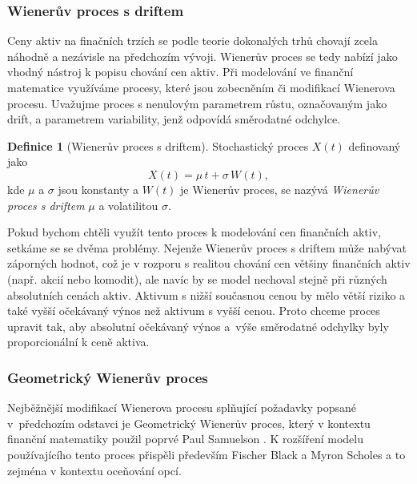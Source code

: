 \documentclass[a4paper,12pt]{report}
\theoremstyle{definition} \newtheorem{definice}[veta]{Definice}
\theoremstyle{remark}
\begin{document}
\subsubsection{Wienerův proces s driftem}
Ceny aktiv na finačních trzích se podle teorie dokonalých trhů chovají zcela náhodně a nezávisle na předchozím vývoji.
Wienerův proces se tedy nabízí jako vhodný nástroj k popisu chování cen aktiv.
Při modelování ve finanční matematice využíváme procesy, které jsou zobecněním či modifikací Wienerova procesu. 
Uvažujme proces s nenulovým parametrem růstu, označovaným jako drift, a parametrem variability, jenž odpovídá směrodatné odchylce.
\begin{definice}[Wienerův proces s driftem]\label{Wieneruv_proces_s_driftem}
Stochastický proces $X(t)$ definovaný jako
$$X(t)  = \mu\, t + \sigma\, W (t),$$
kde $\mu$ a $\sigma$ jsou konstanty a $W (t)$ je Wienerův proces,
se nazývá \textit{Wienerův proces  s driftem} $\mu$ a volatilitou $\sigma$.
\end{definice}
Pokud bychom chtěli využít tento proces k modelování cen finančních aktiv, setkáme se se dvěma problémy.
Nejenže Wienerův proces s driftem může nabývat záporných hodnot, což je v rozporu s realitou chování cen většiny finančních aktiv (např. akcií nebo komodit), ale navíc by se model nechoval stejně při různých absolutních cenách aktiv. 
Aktivum s nižší současnou cenou by mělo větší riziko a také vyšší očekávaný výnos než aktivum s vyšší cenou.
Proto chceme proces upravit tak, aby absolutní očekávaný výnos a~výše směrodatné odchylky byly proporcionální k ceně aktiva. 

\subsubsection{Geometrický Wienerův proces}
Nejběžnější modifikací Wienerova procesu splňující požadavky popsané v~předchozím odstavci je Geometrický Wienerův proces, který v kontextu finanční matematiky použil poprvé Paul Samuelson \cite{samuelson1964rational}.
K rozšíření modelu používajícího tento proces přispěli především Fischer Black a Myron Scholes \cite{black1973pricing} a to zejména v kontextu oceňování opcí.
\end{document}
